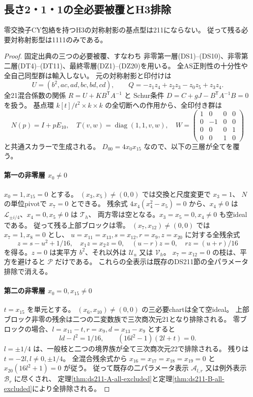 \subsection{長さ2・1・1の全必要被覆とH3排除}
\label{subsec:cubic-CY-finite211-cover}
\begin{theorem}\label{thm:cubic-CY-finite211-empty}
零交換子CY包絡を持つH3の対称射影の基点型は211にならない。
従って残る必要対称射影型は1111のみである。
\end{theorem}
\begin{proof}
固定出典\cite{AS4CYpinned}の三つの必要被覆、すなわち
非零第一層(DS1)--(DS10)、非零第二層(DT4)--(DT11)、最終零層(DZ1)--(DZ20)を用いる。
全AS正則性の十分性や全自己同型群は輸入しない。
元の対称射影と印付けは
\[
 U=(b^2,ac,ad,bc,bd,cd),\qquad
 Q=-z_1z_4+z_2z_3-z_0z_5+z_3z_4.
\]
全21混合係数の関係 $R=U+KB^{\mathsf T}A^{-1}$ と
Schur条件 $D=C+gJ-B^{\mathsf T}A^{-1}B=0$ を扱う。
基点環 $k[t]/t^2\times k\times k$ の全切断への作用から、全印付き群は
\[
 N(p)=I+pE_{10},\quad T(v,w)=\operatorname{diag}(1,1,v,w),\quad
 W=\begin{pmatrix}1&0&0&0\\0&-1&0&0\\0&0&0&1\\0&0&1&0\end{pmatrix}
\]
と共通スカラーで生成される。
$D_{00}=4x_0x_{15}$ なので、以下の三層が全てを覆う。

\paragraph{第一の非零層 $x_0\ne0$}
$x_0=1,x_{15}=0$ とする。
$(x_3,x_5)\ne(0,0)$ では交換と尺度変更で $x_3=1$、
$N$ の単位pivotで $x_7=0$ とできる。
残余式 $4x_4(x_4^2-x_5)=0$ から、$x_4\ne0$ は
$\mathcal L_{\pm i/4}$、$x_4=0,x_5\ne0$ は $\mathcal T_h$、
両方零は空となる。$x_3=x_5=0,x_4\ne0$ も空idealである。
従って残る上部ブロックは零。
$(x_7,x_{12})\ne(0,0)$ では $x_7=1,x_8=0$ とし、
$u=x_{11}=x_{13},s=x_{12},r=x_9,z=x_{20}$ に対する全残余式
\[
 z=s-u^2+1/16,\quad x_1z=x_2z=0,\quad (u-r)z=0,\quad rz=(u+r)/16
\]
を得る。$z=0$ は実平方 $b^2$、それ以外は $\mathcal U_u$ 又は $\mathcal V_h$。
$x_7=x_{12}=0$ の枝は、平方を避けると $\mathcal P$ だけである。
これらの全表示は既存のDS211節の全パラメータ排除で消える。

\paragraph{第二の非零層 $x_0=0,x_{15}\ne0$}
$t=x_{15}$ を単元とする。
$(x_6,x_{10})\ne(0,0)$ の三必要chartは全て空ideal。
上部ブロック非零の残余は二つの二変数族で三次商次元21となり排除される。
零ブロックの場合、$l=x_{11}-t,r=x_9,d=x_{13}-x_9$ とすると
\[
 ld-l^2=1/16,\qquad (16l^2-1)(2l+t)=0.
\]
$l=\pm1/4$ は、一般枝と二つの境界族が全て三次商次元22で排除される。
残りは $t=-2l,l\ne0,\pm1/4$。
全混合残余式から $x_{16}=x_{17}=x_{18}=x_{19}=0$ と
$x_{20}(16l^2+1)=0$ が従う。
従って既存の二パラメータ表示 $\mathcal A_{l,r}$ 又は例外表示 $\mathcal B_r$ に尽くされ、
定理\ref{thm:ds211-A-all-excluded}と定理\ref{thm:ds211-B-all-excluded}により全排除される。


\end{proof}
